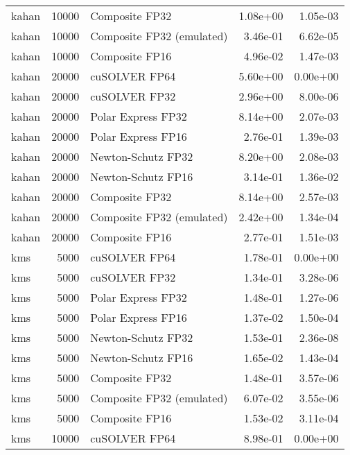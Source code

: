 \begin{table}
\begin{tabular}{lrlrr}
    kahan & 10000 &            Composite FP32 &  1.08e+00 &        1.05e-03 \\
    kahan & 10000 & Composite FP32 (emulated) &  3.46e-01 &        6.62e-05 \\
    kahan & 10000 &            Composite FP16 &  4.96e-02 &        1.47e-03 \\
    kahan & 20000 &             cuSOLVER FP64 &  5.60e+00 &        0.00e+00 \\
    kahan & 20000 &             cuSOLVER FP32 &  2.96e+00 &        8.00e-06 \\
    kahan & 20000 &        Polar Express FP32 &  8.14e+00 &        2.07e-03 \\
    kahan & 20000 &        Polar Express FP16 &  2.76e-01 &        1.39e-03 \\
    kahan & 20000 &        Newton-Schutz FP32 &  8.20e+00 &        2.08e-03 \\
    kahan & 20000 &        Newton-Schutz FP16 &  3.14e-01 &        1.36e-02 \\
    kahan & 20000 &            Composite FP32 &  8.14e+00 &        2.57e-03 \\
    kahan & 20000 & Composite FP32 (emulated) &  2.42e+00 &        1.34e-04 \\
    kahan & 20000 &            Composite FP16 &  2.77e-01 &        1.51e-03 \\
      kms &  5000 &             cuSOLVER FP64 &  1.78e-01 &        0.00e+00 \\
      kms &  5000 &             cuSOLVER FP32 &  1.34e-01 &        3.28e-06 \\
      kms &  5000 &        Polar Express FP32 &  1.48e-01 &        1.27e-06 \\
      kms &  5000 &        Polar Express FP16 &  1.37e-02 &        1.50e-04 \\
      kms &  5000 &        Newton-Schutz FP32 &  1.53e-01 &        2.36e-08 \\
      kms &  5000 &        Newton-Schutz FP16 &  1.65e-02 &        1.43e-04 \\
      kms &  5000 &            Composite FP32 &  1.48e-01 &        3.57e-06 \\
      kms &  5000 & Composite FP32 (emulated) &  6.07e-02 &        3.55e-06 \\
      kms &  5000 &            Composite FP16 &  1.53e-02 &        3.11e-04 \\
      kms & 10000 &             cuSOLVER FP64 &  8.98e-01 &        0.00e+00 \\

\end{tabular}
\end{table}
